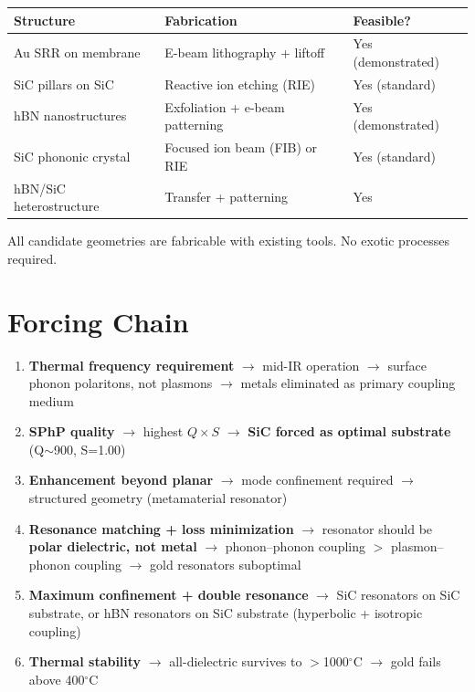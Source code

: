 \documentclass[11pt, a4paper]{article}
\begin{document}
\begin{center}
\begin{tabular}{@{}lll@{}}
\toprule
\textbf{Structure} & \textbf{Fabrication} &
  \textbf{Feasible?} \\
\midrule
Au SRR on membrane & E-beam lithography + liftoff &
  \textcolor{nm-green}{Yes (demonstrated)} \\
SiC pillars on SiC & Reactive ion etching (RIE) &
  \textcolor{nm-green}{Yes (standard)} \\
hBN nanostructures & Exfoliation + e-beam patterning &
  \textcolor{nm-green}{Yes (demonstrated)} \\
SiC phononic crystal & Focused ion beam (FIB) or RIE &
  \textcolor{nm-green}{Yes (standard)} \\
hBN/SiC heterostructure & Transfer + patterning &
  \textcolor{nm-green}{Yes} \\
\bottomrule
\end{tabular}
\end{center}

All candidate geometries are fabricable with existing tools.
No exotic processes required.

\section{Forcing Chain}

\begin{enumerate}
  \item \textbf{Thermal frequency requirement} $\to$ mid-IR
        operation $\to$ surface phonon polaritons, not plasmons
        $\to$ \textcolor{nm-red}{metals eliminated as primary
        coupling medium}

  \item \textbf{SPhP quality} $\to$ highest $Q \times S$ $\to$
        \textbf{SiC forced as optimal substrate} (Q$\sim$900,
        S=1.00)

  \item \textbf{Enhancement beyond planar} $\to$ mode
        confinement required $\to$ structured geometry
        (metamaterial resonator)

  \item \textbf{Resonance matching + loss minimization} $\to$
        resonator should be \textbf{polar dielectric, not metal}
        $\to$ phonon--phonon coupling $>$ plasmon--phonon coupling
        $\to$ \textcolor{nm-red}{gold resonators suboptimal}

  \item \textbf{Maximum confinement + double resonance} $\to$
        SiC resonators on SiC substrate, or hBN resonators on
        SiC substrate (hyperbolic + isotropic coupling)

  \item \textbf{Thermal stability} $\to$ all-dielectric survives
        to $>$1000$^\circ$C $\to$ gold fails above 400$^\circ$C
\end{enumerate}
\end{document}

